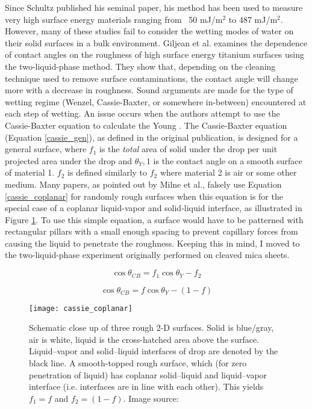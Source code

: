 Since Schultz published his seminal paper, his method has been used to measure very high surface energy materials ranging from ~50 mJ/m$^{2}$ to 487 mJ/m$^{2}$.\cite{Nakamura2015} However, many of these studies fail to consider the wetting modes of water on their solid surfaces in a bulk \nalk environment. Giljean et al. examines the dependence of contact angles on the roughness of high surface energy titanium surfaces using the two-liquid-phase method. They show that, depending on the cleaning technique used to remove surface contaminations, the contact angle will change more with a decrease in roughness. Sound arguments are made for the type of wetting regime (Wenzel, Cassie-Baxter, or somewhere in-between) encountered at each step of wetting. An issue occurs when the authors attempt to use the Cassie-Baxter equation to calculate the Young \ca. The Cassie-Baxter equation (Equation \ref{cassie_gen}), as defined in the original publication,\cite{Cassie1944} is designed for a general surface, where $f_1$ is the \textit{total} area of solid under the drop per unit projected area under the drop and $\theta_Y,1$ is the contact angle on a smooth surface of material 1. $f_2$ is defined similarly to $f_2$ where material 2 is air or some other medium. Many papers, as pointed out by Milne et al.,\cite{Milne2012} falsely use Equation \ref{cassie_coplanar} for randomly rough surfaces when this equation is for the special case of a coplanar liquid-vapor and solid-liquid interface, as illustrated in Figure \ref{fig:cassie_coplanar}. To use this simple equation, a surface would have to be patterned with rectangular pillars with a small enough spacing to prevent capillary forces from causing the liquid to penetrate the roughness. Keeping this in mind, I moved to the two-liquid-phase experiment originally performed on cleaved mica sheets. 

\begin{equation}
\label{cassie_gen}	
\cos\theta_{CB} = f_{1}\cos\theta_{Y} - f_{2}
\end{equation}

\begin{equation}
	\label{cassie_coplanar}	
	\cos\theta_{CB} = f\cos\theta_{Y} - (1-f)
\end{equation}

\begin{figure}[h]
	\centering
	\texttt{[image: cassie\_coplanar]}
	\caption{Schematic close up of three rough 2-D surfaces. Solid is blue/gray, air is white, liquid is the cross-hatched area above the surface. Liquid–vapor and solid–liquid interfaces of drop are denoted by the black line. A smooth-topped rough surface, which (for zero penetration of liquid) has coplanar solid–liquid and liquid–vapor interface (i.e. interfaces are in line with each other). This yields $ f_{1}=f $ and $ f_{2}=(1-f) $. Image source: \cite{Milne2012}}
	\label{fig:cassie_coplanar}
\end{figure}

